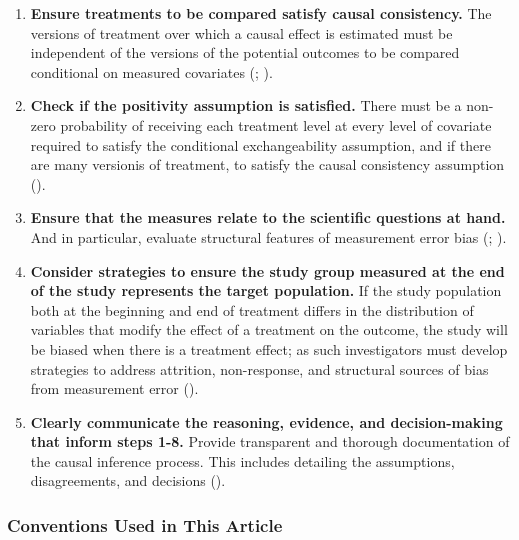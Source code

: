 \documentclass[
  single column]{article}
\begin{document}
\begin{enumerate}
  ;
  ).
\item
  \textbf{Ensure treatments to be compared satisfy causal consistency.}
  The versions of treatment over which a causal effect is estimated must
  be independent of the versions of the potential outcomes to be
  compared conditional on measured covariates
  (;
  ).
\item
  \textbf{Check if the positivity assumption is satisfied.} There must
  be a non-zero probability of receiving each treatment level at every
  level of covariate required to satisfy the conditional exchangeability
  assumption, and if there are many versionis of treatment, to satisfy
  the causal consistency assumption
  ().
\item
  \textbf{Ensure that the measures relate to the scientific questions at
  hand.} And in particular, evaluate structural features of measurement
  error bias (;
  ).
\item
  \textbf{Consider strategies to ensure the study group measured at the
  end of the study represents the target population.} If the study
  population both at the beginning and end of treatment differs in the
  distribution of variables that modify the effect of a treatment on the
  outcome, the study will be biased when there is a treatment effect; as
  such investigators must develop strategies to address attrition,
  non-response, and structural sources of bias from measurement error
  ().
\item
  \textbf{Clearly communicate the reasoning, evidence, and
  decision-making that inform steps 1-8.} Provide transparent and
  thorough documentation of the causal inference process. This includes
  detailing the assumptions, disagreements, and decisions
  ().
\end{enumerate}

\subsubsection{Conventions Used in This
Article}\label{conventions-used-in-this-article}
\end{document}
